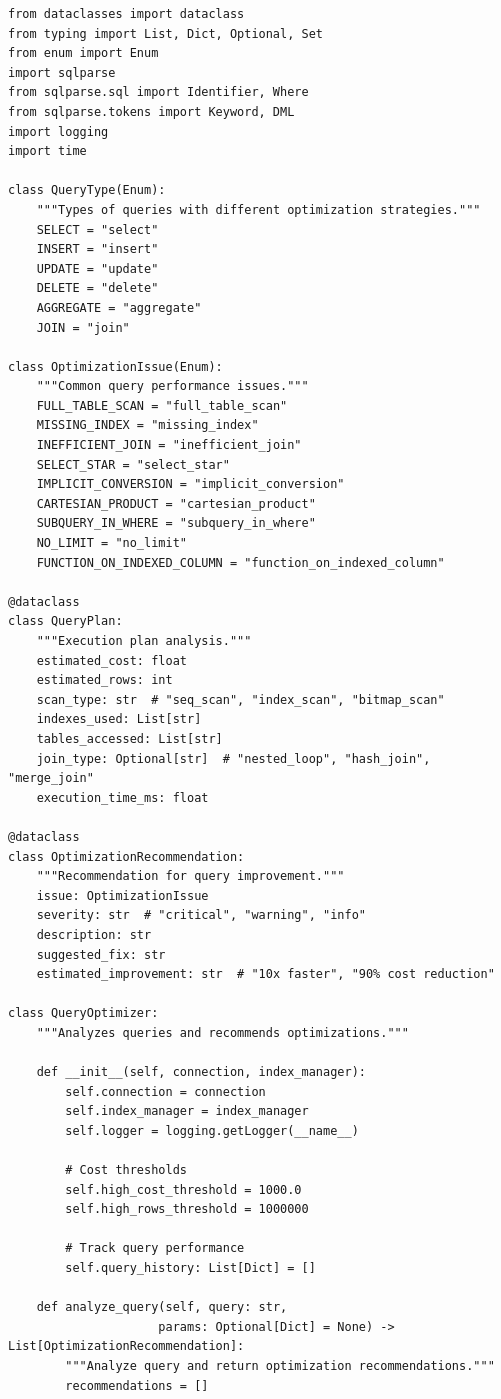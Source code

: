\begin{lstlisting}[style=python, caption=QueryOptimizer with Cost-Based Analysis]
from dataclasses import dataclass
from typing import List, Dict, Optional, Set
from enum import Enum
import sqlparse
from sqlparse.sql import Identifier, Where
from sqlparse.tokens import Keyword, DML
import logging
import time

class QueryType(Enum):
    """Types of queries with different optimization strategies."""
    SELECT = "select"
    INSERT = "insert"
    UPDATE = "update"
    DELETE = "delete"
    AGGREGATE = "aggregate"
    JOIN = "join"

class OptimizationIssue(Enum):
    """Common query performance issues."""
    FULL_TABLE_SCAN = "full_table_scan"
    MISSING_INDEX = "missing_index"
    INEFFICIENT_JOIN = "inefficient_join"
    SELECT_STAR = "select_star"
    IMPLICIT_CONVERSION = "implicit_conversion"
    CARTESIAN_PRODUCT = "cartesian_product"
    SUBQUERY_IN_WHERE = "subquery_in_where"
    NO_LIMIT = "no_limit"
    FUNCTION_ON_INDEXED_COLUMN = "function_on_indexed_column"

@dataclass
class QueryPlan:
    """Execution plan analysis."""
    estimated_cost: float
    estimated_rows: int
    scan_type: str  # "seq_scan", "index_scan", "bitmap_scan"
    indexes_used: List[str]
    tables_accessed: List[str]
    join_type: Optional[str]  # "nested_loop", "hash_join", "merge_join"
    execution_time_ms: float

@dataclass
class OptimizationRecommendation:
    """Recommendation for query improvement."""
    issue: OptimizationIssue
    severity: str  # "critical", "warning", "info"
    description: str
    suggested_fix: str
    estimated_improvement: str  # "10x faster", "90% cost reduction"

class QueryOptimizer:
    """Analyzes queries and recommends optimizations."""

    def __init__(self, connection, index_manager):
        self.connection = connection
        self.index_manager = index_manager
        self.logger = logging.getLogger(__name__)

        # Cost thresholds
        self.high_cost_threshold = 1000.0
        self.high_rows_threshold = 1000000

        # Track query performance
        self.query_history: List[Dict] = []

    def analyze_query(self, query: str,
                     params: Optional[Dict] = None) -> List[OptimizationRecommendation]:
        """Analyze query and return optimization recommendations."""
        recommendations = []


\end{lstlisting}
